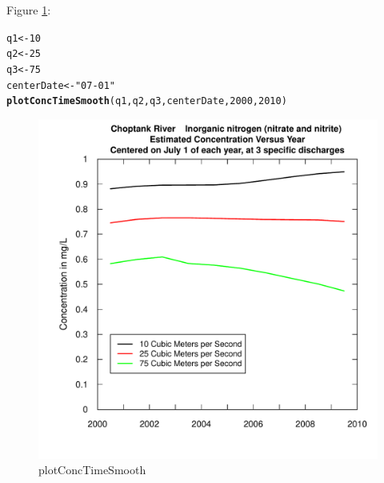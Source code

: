 \documentclass[a4paper,11pt]{article}\usepackage{graphicx, color}
\makeatletter
\newcommand{\hlfunctioncall}[1]{\textcolor[rgb]{0.501960784313725,0,0.329411764705882}{\textbf{#1}}}%
\newcommand{\hlstring}[1]{\textcolor[rgb]{0.6,0.6,1}{#1}}%
\newenvironment{kframe}{%
 \def\at@end@of@kframe{}%
 \ifinner\ifhmode%
  \def\at@end@of@kframe{\end{minipage}}%
  \begin{minipage}{\columnwidth}%
 \fi\fi%
 \def\FrameCommand##1{\hskip\@totalleftmargin \hskip-\fboxsep
 \colorbox{shadecolor}{##1}\hskip-\fboxsep
     \hskip-\linewidth \hskip-\@totalleftmargin \hskip\columnwidth}%
 \MakeFramed {\advance\hsize-\width
   \@totalleftmargin\z@ \linewidth\hsize
   \@setminipage}}%
 {\par\unskip\endMakeFramed%
 \at@end@of@kframe}
\newenvironment{knitrout}{}{} %
\makeatother
\begin{document}
Figure \ref{fig:plotConcTimeSmooth}:
\begin{knitrout}
\color{fgcolor}\begin{kframe}
\begin{alltt}
q1 <- 10
q2 <- 25
q3 <- 75
centerDate <- \hlstring{"07-01"}
\hlfunctioncall{plotConcTimeSmooth}(q1, q2, q3, centerDate, 2000, 2010)
\end{alltt}
\end{kframe}\begin{figure}[]

\includegraphics[width=.5\linewidth,height=.5\linewidth]{figure/plotConcTimeSmooth} \caption[plotConcTimeSmooth]{plotConcTimeSmooth\label{fig:plotConcTimeSmooth}}
\end{figure}


\end{knitrout}
\end{document}
